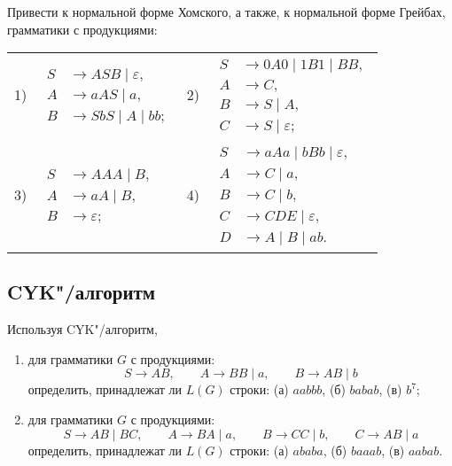Привести к нормальной форме Хомского, а также, к нормальной форме Грей\-бах, грамматики с продукциями:
\begin{center}
\begin{tabular}{l@{\hskip 1cm}l}
        1)\ \ $\begin{aligned}%
            S &\to ASB \mid \varepsilon,\\
            A &\to aAS \mid a,\\
            B &\to SbS \mid A \mid bb;
        \end{aligned}$
&        
        2)\ \ $\begin{aligned}%
            S &\to 0A0 \mid 1B1 \mid BB,\\
            A &\to C,\\
            B &\to S \mid A,\\
            C &\to S \mid \varepsilon;
        \end{aligned}$
\\
        3)\ \ $\begin{aligned}%
            S &\to AAA \mid B,\\
            A &\to aA \mid B,\\
            B &\to \varepsilon;
        \end{aligned}$
&
        4)\ \ $\begin{aligned}%
            S &\to aAa \mid bBb \mid \varepsilon,\\
            A &\to C \mid a,\\
            B &\to C \mid b,\\
            C &\to CDE \mid \varepsilon,\\
            D &\to A \mid B \mid ab.
        \end{aligned}$
\end{tabular}
\end{center}

\subsection*{CYK"/алгоритм}

Используя CYK"/алгоритм,
\begin{enumerate}
    \item
    для грамматики $G$ с продукциями:
    \[
        S \to AB, \qquad
        A \to BB \mid a, \qquad
        B \to AB \mid b
    \]
    определить, принадлежат ли $L(G)$ строки: (а) $aabbb$, (б) $babab$,
    (в) $b^7$;

    \item
    для грамматики $G$ с продукциями:
    \[
        S \to AB \mid BC,\qquad
        A \to BA \mid a,\qquad
        B \to CC \mid b,\qquad
        C \to AB \mid a
    \]
    определить, принадлежат ли $L(G)$ строки: (а) $ababa$, (б) $baaab$, (в) $aabab$.
\end{enumerate}
